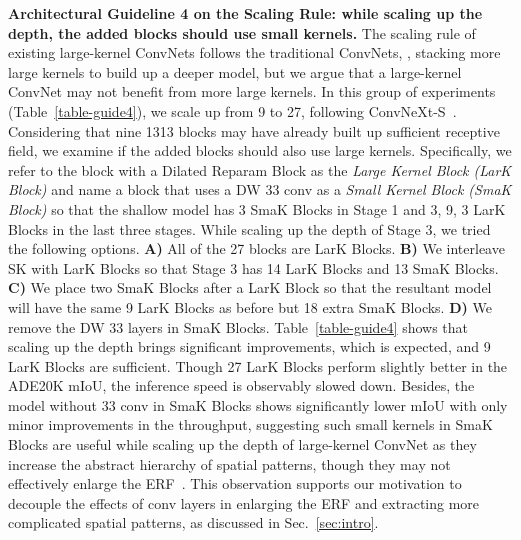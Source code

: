 \documentclass[10pt,twocolumn,letterpaper]{article}
\begin{document}
\noindent\textbf{Architectural Guideline 4 on the Scaling Rule: while scaling up the depth, the added blocks should use small kernels.} The scaling rule of existing large-kernel ConvNets follows the traditional ConvNets, \ie, stacking more large kernels to build up a deeper model, but we argue that a large-kernel ConvNet may not benefit from more large kernels. In this group of experiments (Table~\ref{table-guide4}), we scale up  from 9 to 27, following ConvNeXt-S~\cite{liu2022convnet}. Considering that nine 1313 blocks may have already built up sufficient receptive field, we examine if the added blocks should also use large kernels. Specifically, we refer to the block with a Dilated Reparam Block as the \emph{Large Kernel Block (LarK Block)} and name a block that uses a DW 33 conv as a \emph{Small Kernel Block (SmaK Block)} so that the shallow model has 3 SmaK Blocks in Stage 1 and 3, 9, 3 LarK Blocks in the last three stages. While scaling up the depth of Stage 3, we tried the following options. \textbf{A)} All of the 27 blocks are LarK Blocks. \textbf{B)} We interleave SK with LarK Blocks so that Stage 3 has 14 LarK Blocks and 13 SmaK Blocks. \textbf{C)} We place two SmaK Blocks after a LarK Block so that the resultant model will have the same 9 LarK Blocks as before but 18 extra SmaK Blocks. \textbf{D)} We remove the DW 33 layers in SmaK Blocks. Table~\ref{table-guide4} shows that scaling up the depth brings significant improvements, which is expected, and 9 LarK Blocks are sufficient. Though 27 LarK Blocks perform slightly better in the ADE20K mIoU, the inference speed is observably slowed down. Besides, the model without 33 conv in SmaK Blocks shows significantly lower mIoU with only minor improvements in the throughput, suggesting such small kernels in SmaK Blocks are useful while scaling up the depth of large-kernel ConvNet as they increase the abstract hierarchy of spatial patterns, though they may not effectively enlarge the ERF~\cite{ding2022scaling,erf}. This observation supports our motivation to decouple the effects of conv layers in enlarging the ERF and extracting more complicated spatial patterns, as discussed in Sec.~\ref{sec:intro}. 
\end{document}
